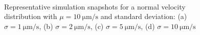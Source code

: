 \documentclass[../../master_thesis_np.tex]{subfiles}
\begin{document}
\begin{figure}[htp]
			\\
			
			\caption{Representative simulation snapshots for a normal velocity distribution with $\mu = \SI{10}{\um\per\second}$ and standard deviation: (a) $\sigma = \SI{1}{\um\per\second}$, (b) $\sigma = \SI{2}{\um\per\second}$, (c) $\sigma = \SI{5}{\um\per\second}$, (d) $\sigma = \SI{10}{\um\per\second}$}
			\label{fig:lj_vdist_situa}
		\end{figure}
		
\end{document}

